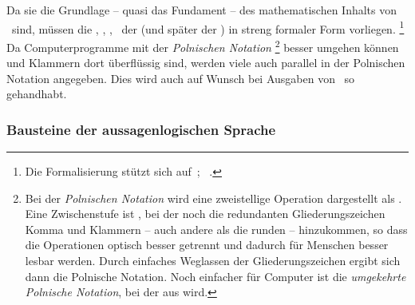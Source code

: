 Da sie die Grundlage -- quasi das Fundament -- des mathematischen Inhalts von \ASBA\ sind, müssen die , , , \textusw\ der  (und später der ) in streng formaler Form vorliegen.%
\footnote{%
	Die Formalisierung stützt sich auf~\cite{bib:Aussagenlogik}; \alsoname~\cite{bib:LogikDe, bib:LogikEn}.
}
Da Computerprogramme mit der \emph{Polnischen Notation}%
\footnote{%
	Bei der \emph{Polnischen Notation} wird eine zweistellige Operation  dargestellt als .
	Eine Zwischenstufe ist , bei der noch die redundanten Gliederungszeichen Komma und Klammern -- auch andere als die runden -- hinzukommen, so dass die Operationen optisch besser getrennt und dadurch für Menschen besser lesbar werden.
	Durch einfaches Weglassen der Gliederungszeichen ergibt sich dann die Polnische Notation.
	Noch einfacher für Computer ist die \emph{umgekehrte Polnische Notation}, bei der aus   wird.
}
besser umgehen können und Klammern dort überflüssig sind, werden viele  auch parallel in der Polnischen Notation angegeben.
Dies wird auch auf Wunsch bei Ausgaben von \ASBA\ so gehandhabt.

\subsubsection{Bausteine der aussagenlogischen Sprache}%
\label{subsub:Bausteine}

